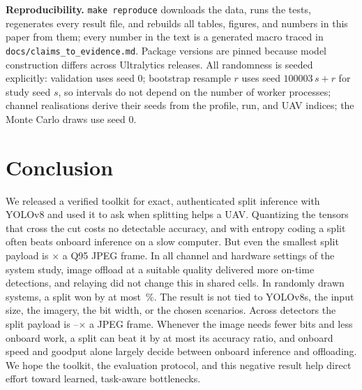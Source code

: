 \documentclass[journal,twocolumn,10pt]{IEEEtran}
\begin{document}
\textbf{Reproducibility.} \texttt{make reproduce} downloads the data, runs the tests, regenerates every result file, and rebuilds all tables, figures, and numbers in this paper from them; every number in the text is a generated macro traced in \texttt{docs/claims\_to\_evidence.md}. Package versions are pinned because model construction differs across Ultralytics releases. All randomness is seeded explicitly: validation uses seed 0; bootstrap resample $r$ uses seed $100003\,s+r$ for study seed $s$, so intervals do not depend on the number of worker processes; channel realisations derive their seeds from the profile, run, and UAV indices; the Monte Carlo draws use seed 0.

\section{Conclusion}
We released a verified toolkit for exact, authenticated split inference with YOLOv8 and used it to ask when splitting helps a UAV. Quantizing the tensors that cross the cut costs no detectable accuracy, and with entropy coding a split often beats onboard inference on a slow computer. But even the smallest split payload is \RatioMinSplitOverJPEGQNinetyFive$\times$ a Q95 JPEG frame. In all \NumCells{} channel and hardware settings of the system study, image offload at a suitable quality delivered more on-time detections, and relaying did not change this in shared cells. In randomly drawn systems, a split won by at most \GenMaxSplitGainPct\,\%. The result is not tied to YOLOv8s, the input size, the imagery, the bit width, or the chosen scenarios. Across \GenNModels{} detectors the split payload is \GenRatioMin--\GenRatioMax$\times$ a JPEG frame. Whenever the image needs fewer bits and less onboard work, a split can beat it by at most its accuracy ratio, and onboard speed and goodput alone largely decide between onboard inference and offloading. We hope the toolkit, the evaluation protocol, and this negative result help direct effort toward learned, task-aware bottlenecks.



\end{document}
